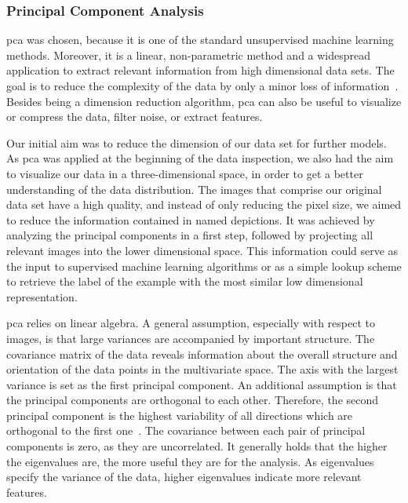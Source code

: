 \subsubsection{Principal Component Analysis}
\label{subsec:PCA}

\acrlong{pca} was chosen, because it is one of the standard unsupervised machine learning methods. Moreover, it is a linear, non-parametric method and a widespread application to extract relevant information from high dimensional data sets. The goal is to reduce the complexity of the data by only a minor loss of information~\citep{shlens2014}. Besides being a dimension reduction algorithm, \acrshort{pca} can also be useful to visualize or compress the data, filter noise, or extract features.

\bigskip
Our initial aim was to reduce the dimension of our data set for further models. As \acrshort{pca} was applied at the beginning of the data inspection, we also had the aim to visualize our data in a three-dimensional space, in order to get a better understanding of the data distribution. The images that comprise our original data set have a high quality, and instead of only reducing the pixel size, we aimed to reduce the information contained in named depictions. It was achieved by analyzing the principal components in a first step, followed by projecting all relevant images into the lower dimensional space. This information could serve as the input to supervised machine learning algorithms or as a simple lookup scheme to retrieve the label of the example with the most similar low dimensional representation.

\bigskip
\acrshort{pca} relies on linear algebra. A general assumption, especially with respect to images, is that large variances are accompanied by important structure. The covariance matrix of the data reveals information about the overall structure and orientation of the data points in the multivariate space. The axis with the largest variance is set as the first principal component. An additional assumption is that the principal components are orthogonal to each other. Therefore, the second principal component is the highest variability of all directions which are orthogonal to the first one~\citep{bohling2006}. The covariance between each pair of principal components is zero, as they are uncorrelated. It generally holds that the higher the eigenvalues are, the more useful they are for the analysis. As eigenvalues specify the variance of the data, higher eigenvalues indicate more relevant features.

